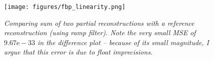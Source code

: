 \begin{figure}[H]
  \centering
  \texttt{[image: figures/fbp\_linearity.png]}
  \vspace{-0.2cm}
  \caption{\small \textit{Comparing sum of two partial reconstructions with a
  reference reconstruction (using ramp filter). Note the very small MSE of
  $9.67\text{e}-33$ in the difference plot -- because of its small magnitude, I
  argue that this error is due to float
  imprecisions.}}
\label{fig:fbp-linearity}
\end{figure}


\sectend
